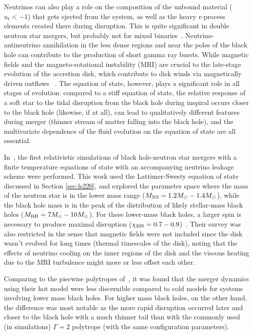 Neutrinos can also play a role on the composition of the unbound material ($u_t < -1$) that gets ejected from the system, as well as the heavy r-process elements created there during disruption.
This is quite significant in double neutron star mergers, but probably not for mixed binaries~\cite{Roberts:2016}.
Neutrino-antineutrino annihilation in the less dense regions and near the poles of the black hole can contribute to the production of short gamma ray bursts.  
While magnetic fields and the magneto-rotational instability (MRI) are crucial to the late-stage evolution of the accretion disk, which contribute to disk winds via magnetically driven outflows ~\cite{Paschalidis2014,Kiuchi:2015qua}.
The equation of state, however, plays a significant role in all stages of evolution: compared to a stiff equation of state, the relative response of a soft star to the tidal disruption from the black hole during inspiral occurs closer to the black hole (likewise, if at all), can lead to qualitatively different features during merger (thinner stream of matter falling into the black hole), and the multivariate dependence of the fluid evolution on the equation of state are all essential.

In~\cite{Foucart:2014nda}, the first relativistic simulations of black hole-neutron star mergers with a finite temperature equations of state with an accompanying neutrino leakage scheme were performed.  
This work used the Lattimer-Swesty equation of state discussed in Section \ref{sec:ls220}, and explored the parameter space where the mass of the neutron star is in the lower mass range ($M_{\rm NS} = 1.2 M_\odot - 1.4 M_\odot$), while the black hole mass is in the peak of the distribution of likely stellar-mass black holes ($M_{\rm BH} = 7 M_\odot - 10 M_\odot$). 
For these lower-mass black holes, a larger spin is necessary to produce maximal disruption ($\chi_{\rm BH} = 0.7 - 0.9$)~\cite{Foucart2012}.  
Their survey was also restricted in the sense that magnetic fields were not included since the disk wasn't evolved for long times (thermal timescales of the disk), noting that the effects of neutrino cooling on the inner regions of the disk and the viscous heating due to the MRI turbulence might more or less offset each other.

Comparing to the piecwise polytropes of~\cite{hebeler2013equation}, it was found that the merger dynamics using their hot model were less discernible compared to cold models for systems involving lower mass black holes.  
For higher mass black holes, on the other hand, the difference was most notable as the more rapid disruption occurred later and closer to the black hole with a much thinner tail than with the commonly used (in simulations) $\Gamma = 2$ polytrope (with the same configuration parameters).

